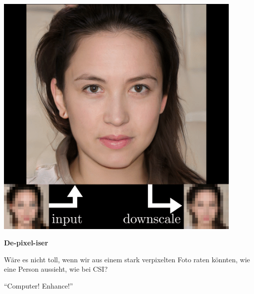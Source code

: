 \documentclass[aspectratio=169,usenames,dvipsnames]{beamer}
\begin{document}
\begin{frame}
\begin{minipage}{.5\textwidth}
\includegraphics[width=0.9\textwidth, keepaspectratio]{images/step9}
\end{minipage}\begin{minipage}{.5\textwidth}
\textbf{De-pixel-iser}
\bigskip

Wäre es nicht toll, wenn wir aus einem stark verpixelten Foto raten könnten, wie eine Person aussieht, wie bei CSI?
\bigskip

``Computer! Enhance!''
\end{minipage}
\end{frame}
\end{document}
